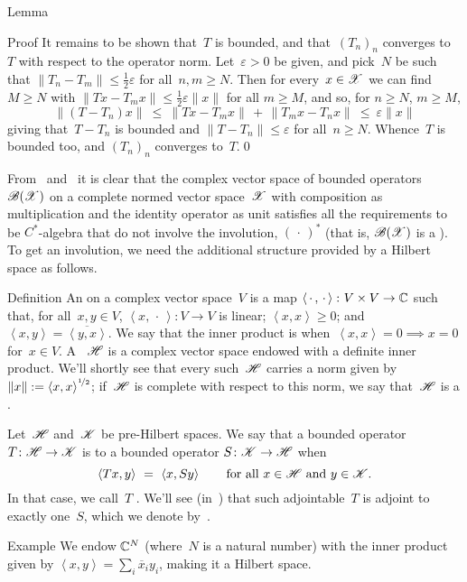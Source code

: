 \documentclass[a]{subfiles}
\begin{document}
\begin{parsec}[hilb]
\begin{point}{Lemma}
\begin{point}{Proof}
It remains to be shown that~$T$ is bounded,
and that~$(T_n)_n$ converges to~$T$ with respect to the operator norm.
Let~$\varepsilon>0$ be given, and pick~$N$ be such that
$\|T_n-T_m\|\leq \frac{1}{2}\varepsilon$ for all~$n,m\geq N$.
Then for every~$x\in \mathscr{X}$
we can find~$M\geq N$ with 
$\|T x - T_m x\|\leq \frac{1}{2}\varepsilon\|x\|$ for all $m\geq M$,
and so,
for $n\geq N$, $m\geq M$,
\begin{equation*}
\|(T - T_n) x\| \ \leq\ \|T x - T_mx\|\,+\,\|T_m x - T_n x\|
\ \leq\  \varepsilon\|x\|
\end{equation*}
giving that~$T-T_n$ is bounded
and $\|T-T_n\|\leq \varepsilon$ for all~$n\geq N$.
Whence~$T$ is bounded too,
and $(T_n)_n$ converges to~$T$.\qed
\end{point}
\end{point}
\begin{point}%
From~
and~
it is clear that the complex vector space
of bounded operators~$\mathscr{B}(\mathscr{X})$
on a complete normed vector space~$\mathscr{X}$
with composition as multiplication
and the identity operator as unit
satisfies all the requirements
to be $C^*$-algebra that do not involve the involution, $(\,\cdot\,)^*$
(that is, $\mathscr{B}(\mathscr{X})$ is a ).
To get an involution,
we need the additional structure
provided by a Hilbert space as follows.
\end{point}
\begin{point}{Definition}%
An 
on a complex vector space~$V$ 
is a map $\left<\,\cdot\,,\,\cdot\,\right>\colon V\times V\to \mathbb{C}$
such that,
for all~$x,y\in V$,
$\left<x,\,\cdot\,\right>\colon V\to V$ is linear;
$\left<x,x\right>\geq 0$;
and
$\left<x,y\right>=\overline{\left<y,x\right>}$.
We say that the inner product is 
when~$\left<x,x\right>=0\implies x=0$ for~$x\in V$.
A ~$\mathscr{H}$
is a complex vector space endowed with a definite inner product.
We'll shortly see that every such~$\mathscr{H}$
carries a norm
given by
 $\|x\|:= \left<x,x\right>^{\nicefrac{1}{2}}$;
if~$\mathscr{H}$ is complete with respect to this norm,
we say that~$\mathscr{H}$ is a .

Let~$\mathscr{H}$ and~$\mathscr{K}$ be pre-Hilbert spaces.
We say that a bounded operator~$T\colon \mathscr{H}\to \mathscr{K}$
is 
to a bounded operator
$S\colon \mathscr{K}\to \mathscr{H}$ 
when
\begin{equation*}
\left<Tx,y\right> \ = \ \left<x,Sy\right>
\qquad\text{for all $x\in \scrH$ and $y\in \scrK$.}
\end{equation*}
In that case, we call~$T$ .
We'll see (in~)
that such adjointable~$T$ is adjoint to exactly one~$S$,
which we denote by~.
\end{point}
\begin{point}{Example}%
We endow $\mathbb{C}^N$
(where~$N$ is a natural number)
with the inner product
given by
$\left<x,y\right>=\sum_i \overline{x}_iy_i$,
making it a Hilbert space.


\end{point}
\end{parsec}
\end{document}

